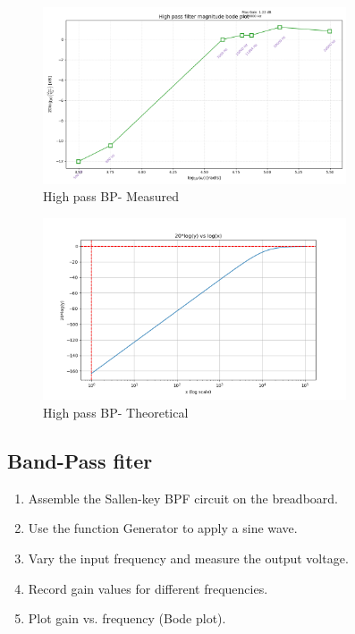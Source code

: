 \documentclass[a4paper,12pt]{article}
\begin{document}
\begin{figure}[H]
    \centering
    \includegraphics[width=0.8\textwidth]{fig/hpb.png}
    \caption{High pass BP- Measured}
    \label{fig:your-label}
\end{figure}

\begin{figure}[H]
    \centering
    \includegraphics[width=0.8\textwidth]{hpfp.png}
    \caption{High pass BP- Theoretical}
    \label{fig:your-label}
\end{figure}

\subsection{Band-Pass fiter}
\begin{enumerate}
     \item Assemble the Sallen-key BPF circuit on the breadboard.
    \item Use the function Generator to apply a sine wave.
    \item Vary the input frequency and measure the output voltage.
    \item Record gain values for different frequencies.
    \item Plot gain vs. frequency (Bode plot). 
\end{enumerate}
\end{document}
